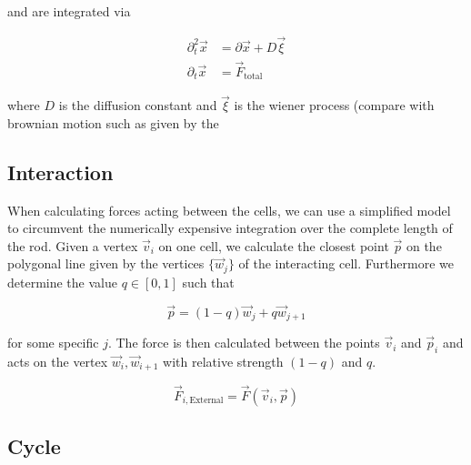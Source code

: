 \documentclass{article}
\begin{document}
and are integrated via

\begin{align}
    \partial_t^2 \vec{x} &= \partial\vec{x} + D\vec{\xi}\\
    \partial_t\vec{x} &= \vec{F}_\text{total}
    \label{equations-of-motion}
\end{align}

where $D$ is the diffusion constant and  $\vec{\xi}$ is the wiener process (compare with
brownian motion such as given by the

\subsection{Interaction}

When calculating forces acting between the cells, we can use a simplified model to circumvent the
numerically expensive integration over the complete length of the rod.
Given a vertex $\vec{v}_i$ on one cell, we calculate the closest point $\vec{p}$ on the polygonal
line given by the vertices $\{\vec{w}_j\}$ of the interacting cell.
Furthermore we determine the value $q\in[0,1]$ such that

\begin{equation}
    \vec{p} = (1-q)\vec{w}_j + q\vec{w}_{j+1}
   \label{connection}
\end{equation}

for some specific $j$.
The force is then calculated between the points $\vec{v}_i$ and $\vec{p}_i$ and acts on
the vertex $\vec{w}_i,\vec{w}_{i+1}$ with relative strength $(1-q)$ and $q$.

\begin{equation}
    \vec{F}_{i,\text{External}} = \vec{F}(\vec{v}_i,\vec{p})
    \label{force-external}
\end{equation}



\subsection{Cycle}
\end{document}
